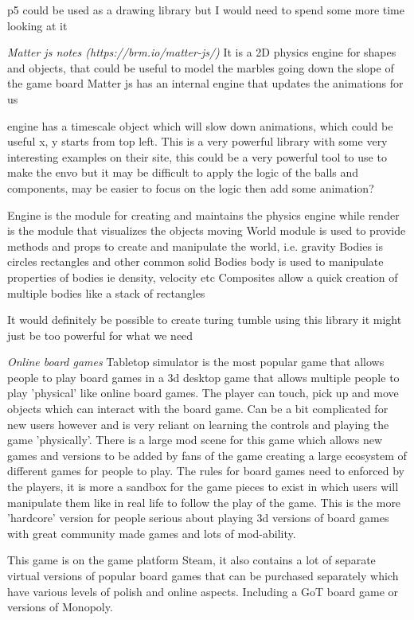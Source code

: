 \documentclass{l4proj}
\begin{document}
p5 could be used as a drawing library but I would need to spend some more time looking at it

\emph{Matter js notes (https://brm.io/matter-js/)}
It is a 2D physics engine for shapes and objects, that could be useful to model the marbles going down the slope of the game board
Matter js has an internal engine that updates the animations for us

engine has a timescale object which will slow down animations, which could be useful
x, y starts from top left.
This is a very powerful library with some very interesting examples on their site, this could be a very powerful tool to use to make the envo but it may be difficult to apply the logic of the balls and components, may be easier to 
focus on the logic then add some animation?

Engine is the module for creating and maintains the physics engine while render is the module that visualizes the objects moving
World module is used to provide methods and props to create and manipulate the world, i.e. gravity
Bodies is circles rectangles and other common solid Bodies
body is used to manipulate properties of bodies ie density, velocity etc
Composites allow a quick creation of multiple bodies like a stack of rectangles 

It would definitely be possible to create turing tumble using this library it might just be too powerful for what we need 

\emph{Online board games}
Tabletop simulator is the most popular game that allows people to play board games in a 3d desktop game that allows multiple people to play 'physical' like online board games.
The player can touch, pick up and move objects which can interact with the board game. Can be a bit complicated for new users however and is very reliant on learning the controls and 
playing the game 'physically'. There is a large mod scene for this game which allows new games and versions to be added by fans of the game creating a large ecosystem of different games for people to play.
The rules for board games need to enforced by the players, it is more a sandbox for the game pieces to exist in which users will manipulate them like in real life to follow the play of the game.
This is the more 'hardcore' version for people serious about playing 3d versions of board games with great community made games and lots of mod-ability.

This game is on the game platform Steam, it also contains a lot of separate virtual versions of popular board games that can be purchased separately which have various levels of polish and online aspects.
Including a GoT board game or versions of Monopoly.
\end{document}
